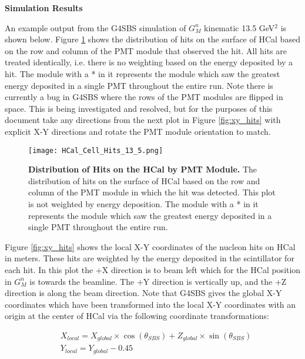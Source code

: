 \documentclass[10pt]{article}
\begin{document}
{\large \noindent \bf{Simulation Results}}
\vspace{3mm}

	An example output from the G4SBS simulation of $G_M^n$ kinematic 13.5 GeV$^2$ is shown below. Figure \ref{fig:cell_hits} shows the distribution of hits on the surface of HCal based on the row and column of the PMT module that observed the hit. All hits are treated identically, i.e. there is no weighting based on the energy deposited by a hit. The module with a * in it represents the module which saw the greatest energy deposited in a single PMT throughout the entire run. Note there is currently a bug in G4SBS where the rows of the PMT modules are flipped in space. This is being investigated and resolved, but for the purposes of this document take any directions from the next plot in Figure \ref{fig:xy_hits} with explicit X-Y directions and rotate the PMT module orientation to match.
	\vspace{3mm}
	
	\begin{figure}[!ht]
	\begin{center}
	\texttt{[image: HCal\_Cell\_Hits\_13\_5.png]}
	\end{center}
	\caption{
	{\bf{Distribution of Hits on the HCal by PMT Module.}} The distribution of hits on the surface of HCal based on the row and column of the PMT module in which the hit was detected. This plot is not weighted by energy deposition. The module with a * in it represents the module which saw the greatest energy deposited in a single PMT throughout the entire run.}
	\label{fig:cell_hits}
	\end{figure}	
	
	Figure \ref{fig:xy_hits} shows the local X-Y coordinates of the nucleon hits on HCal in meters. These hits are weighted by the energy deposited in the scintillator for each hit. In this plot the +X direction is to beam left which for the HCal position in $G_M^n$ is towards the beamline. The +Y direction is vertically up, and the +Z direction is along the beam direction. Note that G4SBS gives the global X-Y coordinates which have been transformed into the local X-Y coordinates with an origin at the center of HCal via the following coordinate transformations:
	
	\begin{align}
		&X_{local} = X_{global}\times\cos\left(\theta_{SBS}\right) + Z_{global}\times\sin\left(\theta_{SBS}\right) \\
		&Y_{local} = Y_{global} - 0.45
	\end{align}
	
\end{document}
